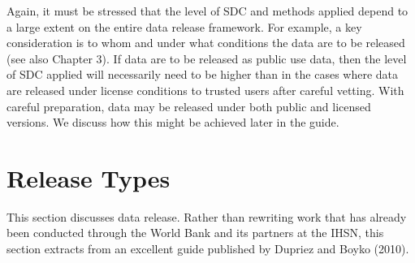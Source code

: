 \documentclass[letterpaper,10pt,english]{sphinxmanual}
\begin{document}
Again, it must be stressed that the level of SDC and methods applied
depend to a large extent on the entire data release framework. For
example, a key consideration is to whom and under what conditions the
data are to be released (see also Chapter 3). If data are to be released
as public use data, then the level of SDC applied will necessarily need
to be higher than in the cases where data are released under license
conditions to trusted users after careful vetting. With careful
preparation, data may be released under both public and licensed
versions. We discuss how this might be achieved later in the guide.


\section{Release Types}
\label{\detokenize{SDC_intro:release-types}}
This section discusses data release. Rather than rewriting work that has
already been conducted through the World Bank and its partners at the
IHSN, this section extracts from an excellent guide published by Dupriez
and Boyko (2010).
\end{document}
